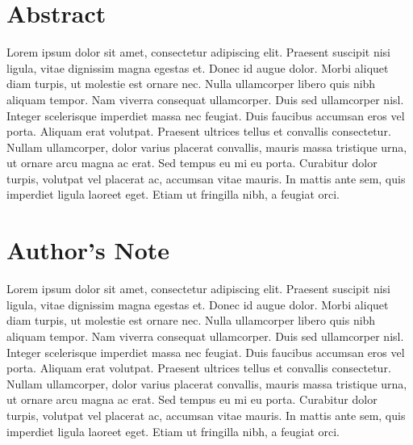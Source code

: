 





\chapter*{Abstract} \label{ch:abstract}		%
\begin{singlespacing}

Lorem ipsum dolor sit amet, consectetur adipiscing elit. Praesent suscipit nisi ligula, vitae dignissim magna egestas et. Donec id augue dolor. Morbi aliquet diam turpis, ut molestie est ornare nec. Nulla ullamcorper libero quis nibh aliquam tempor. Nam viverra consequat ullamcorper. Duis sed ullamcorper nisl. Integer scelerisque imperdiet massa nec feugiat. Duis faucibus accumsan eros vel porta. Aliquam erat volutpat. Praesent ultrices tellus et convallis consectetur. Nullam ullamcorper, dolor varius placerat convallis, mauris massa tristique urna, ut ornare arcu magna ac erat. Sed tempus eu mi eu porta. Curabitur dolor turpis, volutpat vel placerat ac, accumsan vitae mauris. In mattis ante sem, quis imperdiet ligula laoreet eget. Etiam ut fringilla nibh, a feugiat orci.

\end{singlespacing}

\chapter*{Author's Note}	\label{ch:authors_note}	%
\begin{singlespacing}

Lorem ipsum dolor sit amet, consectetur adipiscing elit. Praesent suscipit nisi ligula, vitae dignissim magna egestas et. Donec id augue dolor. Morbi aliquet diam turpis, ut molestie est ornare nec. Nulla ullamcorper libero quis nibh aliquam tempor. Nam viverra consequat ullamcorper. Duis sed ullamcorper nisl. Integer scelerisque imperdiet massa nec feugiat. Duis faucibus accumsan eros vel porta. Aliquam erat volutpat. Praesent ultrices tellus et convallis consectetur. Nullam ullamcorper, dolor varius placerat convallis, mauris massa tristique urna, ut ornare arcu magna ac erat. Sed tempus eu mi eu porta. Curabitur dolor turpis, volutpat vel placerat ac, accumsan vitae mauris. In mattis ante sem, quis imperdiet ligula laoreet eget. Etiam ut fringilla nibh, a feugiat orci.

\end{singlespacing}


